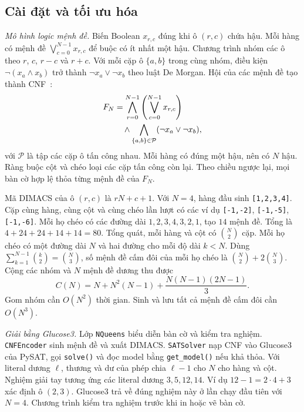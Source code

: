 \documentclass[conference]{IEEEtran}
\begin{document}
\subsection{Cài đặt và tối ưu hóa}
\textit{Mô hình logic mệnh đề.}
Biến Boolean $x_{r,c}$ đúng khi ô $(r,c)$ chứa hậu. Mỗi hàng có
mệnh đề $\bigvee_{c=0}^{N-1}x_{r,c}$ để buộc có ít nhất một hậu.
Chương trình nhóm các ô theo $r$, $c$, $r-c$ và $r+c$. Với mỗi cặp
ô $\{a,b\}$ trong cùng nhóm, điều kiện $\neg(x_a\land x_b)$ trở
thành $\neg x_a\lor\neg x_b$ theo luật De Morgan. Hội của các
mệnh đề tạo thành CNF~\cite{lec09}:
\begin{align}
F_N &= \bigwedge_{r=0}^{N-1}
      \left(\bigvee_{c=0}^{N-1}x_{r,c}\right)\notag\\
    &\quad {}\land\bigwedge_{\{a,b\}\in\mathcal{P}}
      (\neg x_a\lor\neg x_b),
\end{align}
với $\mathcal{P}$ là tập các cặp ô tấn công nhau. Mỗi hàng có
đúng một hậu, nên có $N$ hậu. Ràng buộc cột và chéo loại các cặp
tấn công còn lại. Theo chiều ngược lại, mọi bàn cờ hợp lệ thỏa
từng mệnh đề của $F_N$.

Mã DIMACS của ô $(r,c)$ là $rN+c+1$. Với $N=4$, hàng đầu sinh
\texttt{[1,2,3,4]}. Cặp cùng hàng, cùng cột và cùng chéo lần lượt
có các ví dụ \texttt{[-1,-2]}, \texttt{[-1,-5]}, \texttt{[-1,-6]}.
Mỗi họ chéo có các đường dài $1,2,3,4,3,2,1$, tạo $14$ mệnh đề.
Tổng là $4+24+24+14+14=80$. Tổng quát, mỗi hàng và cột có
$\binom{N}{2}$ cặp. Mỗi họ chéo có một đường dài $N$ và hai
đường cho mỗi độ dài $k<N$. Dùng
$\sum_{k=1}^{N-1}\binom{k}{2}=\binom{N}{3}$, số mệnh đề
cấm đôi của mỗi họ chéo là $\binom{N}{2}+2\binom{N}{3}$.
Cộng các nhóm và $N$ mệnh đề dương thu được
\begin{equation}
C(N)=N+N^2(N-1)+\frac{N(N-1)(2N-1)}{3}.
\end{equation}
Gom nhóm cần $O(N^2)$ thời gian. Sinh và lưu tất cả mệnh đề cấm
đôi cần $O(N^3)$.

\textit{Giải bằng Glucose3.}
Lớp \texttt{NQueens} biểu diễn bàn cờ và kiểm tra nghiệm.
\texttt{CNFEncoder} sinh mệnh đề và xuất DIMACS. \texttt{SATSolver}
nạp CNF vào Glucose3 của PySAT, gọi \texttt{solve()} và đọc model
bằng \texttt{get\_model()} nếu khả thỏa. Với literal dương $\ell$,
thương và dư của phép chia $\ell-1$ cho $N$ cho hàng và cột.
Nghiệm giải tay tương ứng các literal dương $3,5,12,14$.
Ví dụ $12-1=2\cdot4+3$ xác định ô $(2,3)$. Glucose3 trả về đúng
nghiệm này ở lần chạy đầu tiên với $N=4$. Chương trình kiểm tra
nghiệm trước khi in hoặc vẽ bàn cờ.
\end{document}
